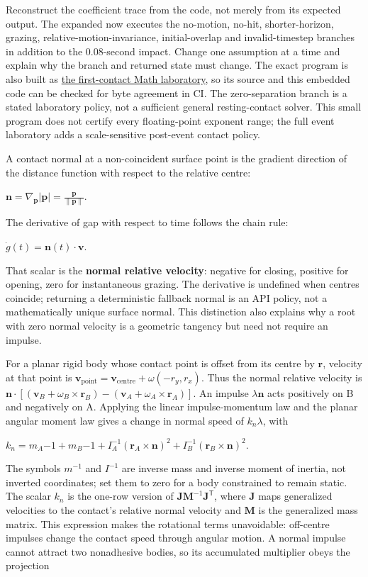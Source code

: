 Reconstruct the coefficient trace from the code, not merely from its expected output. The expanded  now executes the no-motion, no-hit, shorter-horizon, grazing, relative-motion-invariance, initial-overlap and invalid-timestep branches in addition to the 0.08-second impact. Change one assumption at a time and explain why the branch and returned state must change. The exact program is also built as \hyperref[source-file-c54e3c362767ccd1911378ae]{the first-contact Math laboratory}, so its source and this embedded code can be checked for byte agreement in CI. The zero-separation branch is a stated laboratory policy, not a sufficient general resting-contact solver. This small program does not certify every floating-point exponent range; the full event laboratory adds a scale-sensitive post-event contact policy.

A contact normal at a non-coincident surface point is the gradient direction of the distance function with respect to the relative centre:

\(\mathbf n=\nabla_{\mathbf p}|\mathbf p| =\frac{\mathbf p}{\|\mathbf p\|}.\)

The derivative of gap with respect to time follows the chain rule:

\(\dot g(t)=\mathbf n(t)\cdot\mathbf v.\)

That scalar is the \textbf{normal relative velocity}: negative for closing, positive for opening, zero for instantaneous grazing. The derivative is undefined when centres coincide; returning a deterministic fallback normal is an API policy, not a mathematically unique surface normal. This distinction also explains why a root with zero normal velocity is a geometric tangency but need not require an impulse.

For a planar rigid body whose contact point is offset from its centre by \(\mathbf r\), velocity at that point is \(\mathbf v_{\text{point}}=\mathbf v_{\text{centre}}+\omega(-r_y,r_x)\). Thus the normal relative velocity is \(\mathbf n\cdot[(\mathbf v_B+\omega_B\times\mathbf r_B)-(\mathbf v_A+\omega_A\times\mathbf r_A)]\). An impulse \(\lambda\mathbf n\) acts positively on B and negatively on A. Applying the linear impulse-momentum law and the planar angular moment law gives a change in normal speed of \(k_n\lambda\), with

\(k_n=m_A{-1}+m_B{-1} +I_A^{-1}(\mathbf r_A\times\mathbf n)^2 +I_B^{-1}(\mathbf r_B\times\mathbf n)^2.\)

The symbols \(m^{-1}\) and \(I^{-1}\) are inverse mass and inverse moment of inertia, not inverted coordinates; set them to zero for a body constrained to remain static. The scalar \(k_n\) is the one-row version of \(\mathbf J\mathbf M^{-1}\mathbf J^\mathsf T\), where \(\mathbf J\) maps generalized velocities to the contact's relative normal velocity and \(\mathbf M\) is the generalized mass matrix. This expression makes the rotational terms unavoidable: off-centre impulses change the contact speed through angular motion. A normal impulse cannot attract two nonadhesive bodies, so its accumulated multiplier obeys the projection

